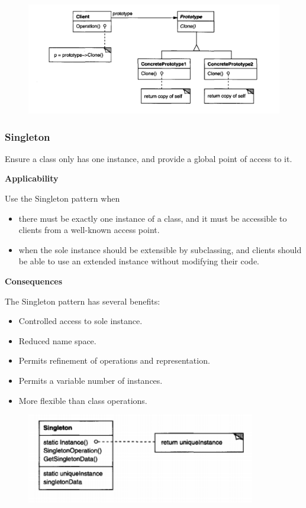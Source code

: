 \documentclass{article}
\begin{document}
\begin{figure}[h]
    \centering
    \includegraphics[width=14cm]{diagrams/pattern-4-prototype.png}
\end{figure}

\newpage
\subsubsection{Singleton}
Ensure a class only has one instance, and provide a global point of
access to it.

\textbf{Applicability}

Use the Singleton pattern when
\begin{itemize}
    \item there must be exactly one instance of a class, and it must be accessible to clients from a well-known access point.
    \item when the sole instance should be extensible by subclassing, and clients should be able to use an extended instance without modifying their code.
\end{itemize}

\textbf{Consequences}

The Singleton pattern has several benefits:

\begin{itemize}
    \item Controlled access to sole instance.
    \item Reduced name space.
    \item Permits refinement of operations and representation.
    \item Permits a variable number of instances.
    \item More flexible than class operations.
\end{itemize}

\begin{figure}[h]
    \centering
    \includegraphics[width=10cm]{diagrams/pattern-5-singleton.png}
\end{figure}
\end{document}
